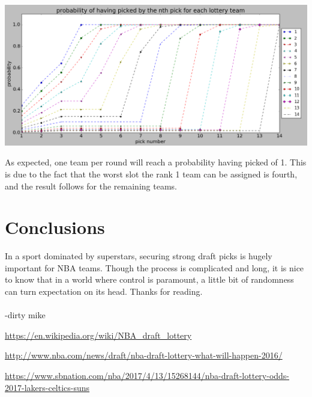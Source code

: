 \documentclass[letterpaper,12pt]{article}
\begin{document}
\begin{center}
\includegraphics[scale=0.5]{../images/plot2.png} 
\end{center} \newpage

As expected, one team per round will reach a probability having picked of 1. This is due to the fact that the worst slot the rank 1 team can be assigned is fourth, and the result follows for the remaining teams. 

\section{Conclusions}
In a sport dominated by superstars, securing strong draft picks is hugely important for NBA teams. Though the process is complicated and long, it is nice to know that in a world where control is paramount, a little bit of randomness can turn expectation on its head. Thanks for reading. \\ \\ 
-dirty mike


\newpage
\begin{thebibliography}{99}

\url{https://en.wikipedia.org/wiki/NBA_draft_lottery}

\url{http://www.nba.com/news/draft/nba-draft-lottery-what-will-happen-2016/}

\url{https://www.sbnation.com/nba/2017/4/13/15268144/nba-draft-lottery-odds-2017-lakers-celtics-suns}

\end{thebibliography}
\end{document}
